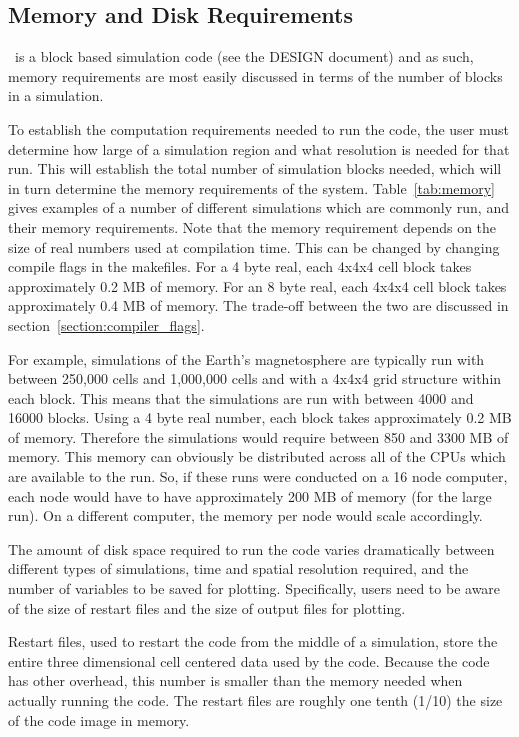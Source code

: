 \subsection{Memory and Disk Requirements \label{section:memory}}

\BATSRUS\ is a block based simulation code (see the DESIGN document)
and as such, memory requirements are most easily discussed in terms 
of the number of blocks in a simulation.

To establish the computation requirements needed to run the code, the
user must determine how large of a simulation region 
and what resolution is needed for that run.  This will
establish the total number of simulation blocks needed,
which will in turn determine the memory requirements of the system.
Table~\ref{tab:memory} gives examples of a number of different simulations
which are commonly run, and their memory requirements.  
Note that the memory requirement depends on the size of real numbers 
used at compilation time. This can be changed by changing compile flags
in the makefiles.  For a 4 byte real, each 4x4x4 cell block takes 
approximately 0.2 MB of memory.  For an 8 byte real, each 4x4x4 cell block takes
approximately 0.4 MB of memory.  The trade-off between the two are discussed
in section~\ref{section:compiler_flags}.

For example, simulations of the Earth's magnetosphere are typically
run with between 250,000 cells and 1,000,000 cells and with a 4x4x4 
grid structure within each block.  This means that the simulations 
are run with between 4000 and
16000 blocks.  Using a 4 byte real number, each block takes approximately 
0.2 MB of memory.
Therefore the simulations would require between 850 and 3300 MB of
memory.  This memory can obviously be distributed across all of the
CPUs which are available to the run.  So, if these runs were conducted
on a 16 node computer, each node would have to have approximately 200
MB of memory (for the large run).  On a different computer, the memory
per node would scale accordingly.

The amount of disk space required to run the code varies dramatically
between different types of simulations, time and spatial resolution
required, and the number of variables to be saved for plotting.  
Specifically, users need to be aware of the size of restart files and
the size of output files for plotting.

Restart files, used to restart the code from the middle of a simulation,
store the entire three dimensional cell centered data used by the code.
Because the code has other overhead, this number is smaller than the memory
needed when actually running the code.  The restart files are roughly
one tenth (1/10) the size of the code image in memory.

